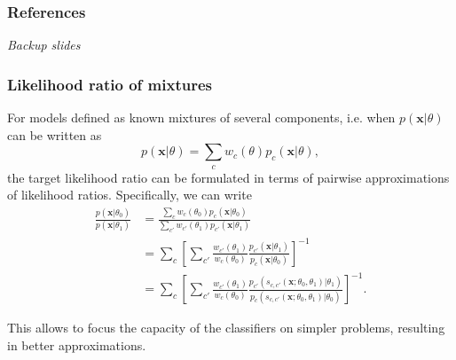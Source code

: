 \documentclass{beamer}
\begin{document}
\begin{frame}
    \frametitle{References}
    {\footnotesize
    
    }
\end{frame}

\begin{frame}
    \vfill
    \centering
    \it Backup slides
    \vfill
\end{frame}


\begin{frame}
    \frametitle{Likelihood ratio of mixtures}

    For models defined as known mixtures of several components, i.e. when $p(\mathbf{x}|\theta)$ can be written as
    {\scriptsize
    \begin{equation*}
    p(\mathbf{x}|\theta)=\sum_c w_c(\theta) p_c(\mathbf{x}| \theta),
    \end{equation*}}
    the target likelihood ratio can be formulated in terms of pairwise
    approximations of likelihood ratios. Specifically, we can write
    {\scriptsize
    \begin{align*}
    \frac{p(\mathbf{x}|\theta_0)}{p(\mathbf{x}|\theta_1)} &= \frac{\sum_c w_c(\theta_0) p_c(\mathbf{x}| \theta_0)}{\sum_{c'} w_{c'}(\theta_1) p_{c'}(\mathbf{x}| \theta_1)} \nonumber \\
    &= \sum_c \left[ \sum_{c'} \frac{ w_{c'}(\theta_1)}{w_c(\theta_0)} \frac{ p_{c'}(\mathbf{x}| \theta_1)}{  p_c(\mathbf{x}| \theta_0)}  \right]^{-1} \nonumber \\
    &= \sum_c \left[ \sum_{c'} \frac{ w_{c'}(\theta_1)}{w_c(\theta_0)} \frac{ p_{c'}(s_{c,c'}(\mathbf{x};\theta_0, \theta_1)| \theta_1)}{ p_c(s_{c,c'}(\mathbf{x};\theta_0, \theta_1)| \theta_0)}  \right]^{-1}. \label{eq:decomposedResult}
    \end{align*}}

    This allows to focus the capacity of the classifiers on simpler problems, resulting in better approximations.

\end{frame}
\end{document}
